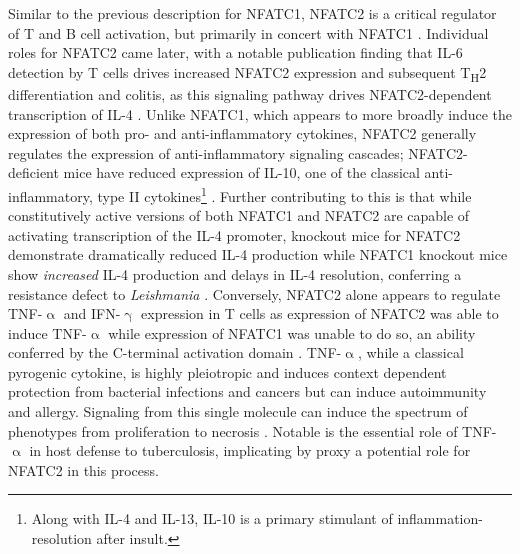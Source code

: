 Similar to the previous description for NFATC1, NFATC2 is a critical regulator of T and B cell activation, but primarily in concert with NFATC1 \citep{Peng2001}. Individual roles for NFATC2 came later, with a notable publication finding that IL\hyp{}6 detection by T cells drives increased NFATC2 expression and subsequent T\textsubscript{H}2 differentiation and colitis, as this signaling pathway drives NFATC2\hyp{}dependent transcription of IL\hyp{}4 \citep{Diehl2002, Weigmann2008}. Unlike NFATC1, which appears to more broadly induce the expression of both pro\hyp{} and anti\hyp{}inflammatory cytokines, NFATC2 generally regulates the expression of anti\hyp{}inflammatory signaling cascades; NFATC2\hyp{}deficient mice have reduced expression of IL\hyp{}10, one of the classical anti\hyp{}inflammatory, type II cytokines\footnote{Along with IL\hyp{}4 and IL\hyp{}13, IL\hyp{}10 is a primary stimulant of inflammation\hyp{}resolution after insult.} \citep{Lee2009}. Further contributing to this is that while constitutively active versions of both NFATC1 and NFATC2 are capable of activating transcription of the IL\hyp{}4 promoter, knockout mice for NFATC2 demonstrate dramatically reduced IL\hyp{}4 production while NFATC1 knockout mice show \textit{increased} IL\hyp{}4 production \citep{Monticelli2002} and delays in IL\hyp{}4 resolution, conferring a resistance defect to \textit{Leishmania} \citep{Kiani1997}. Conversely, NFATC2 alone appears to regulate TNF\hyp{}$\upalpha$ and IFN\hyp{}$\upgamma$ expression in T cells as expression of NFATC2 was able to induce TNF\hyp{}$\upalpha$ while expression of NFATC1 was unable to do so, an ability conferred by the C\hyp{}terminal activation domain \citep{Kaminuma2008, Teixeira2005}. TNF\hyp{}$\upalpha$, while a classical pyrogenic cytokine, is highly pleiotropic and induces context dependent protection from bacterial infections and cancers but can induce autoimmunity and allergy. Signaling from this single molecule can induce the spectrum of phenotypes from proliferation to necrosis \citep{Gough2020}. Notable is the essential role of TNF\hyp{}$\upalpha$ in host defense to tuberculosis, implicating by proxy a potential role for NFATC2 in this process. 

